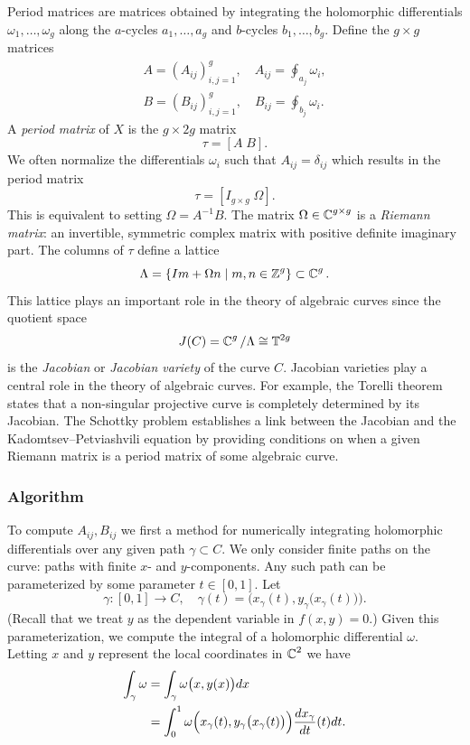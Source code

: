 Period matrices are matrices obtained by integrating the holomorphic
differentials $\omega_1, \ldots, \omega_g$ along the $a$-cycles $a_1,\ldots,a_g$
and $b$-cycles $b_1,\ldots,b_g$. Define the $g \times g$ matrices
\begin{align*}
  A = \left( A_{ij} \right)_{i,j=1}^g,
  \quad A_{ij} = \oint_{a_j} \omega_i, \\
  B = \left( B_{ij} \right)_{i,j=1}^g,
  \quad B_{ij} = \oint_{b_j} \omega_i.
\end{align*}
A {\it period matrix} of $X$ is the $g \times 2g$ matrix
\[
  \tau = \left[ A \; B \right].
\]
We often normalize the differentials $\omega_i$ such that $A_{ij} = \delta_{ij}$
which results in the period matrix
\begin{equation} \label{eqn: period-matrix}
  \tau = \left[ I_{g \times g} \; \Omega \right].
\end{equation}
This is equivalent to setting $\Omega = A^{-1}B$. The matrix $\Omega \in \operatorname{\mathbb{C}}^{g
  \times g}$ is a {\it Riemann matrix}: an invertible, symmetric complex matrix
with positive definite imaginary part. The columns of $\tau$ define a lattice
\[
  \Lambda = \{I m + \Omega n \; | \; m,n \in \operatorname{\mathbb{Z}}^g\} \subset \operatorname{\mathbb{C}}^g.
\]
This lattice plays an important role in the theory of algebraic curves since the
quotient space
\begin{equation} \label{eqn: jacobian}
  J(C) = \operatorname{\mathbb{C}}^g / \Lambda \cong \mathbb{T}^{2g}
\end{equation}
is the {\it Jacobian} or {\it Jacobian variety} of the curve $C$. Jacobian
varieties play a central role in the theory of algebraic curves. For example,
the Torelli theorem \cite{Mumford99} states that a non-singular projective curve
is completely determined by its Jacobian. The Schottky problem establishes a
link between the Jacobian and the Kadomtsev--Petviashvili equation by providing
conditions on when a given Riemann matrix is a period matrix of some algebraic
curve.


%
\subsubsection*{Algorithm}
%

To compute $A_{ij}, B_{ij}$ we first a method for numerically integrating
holomorphic differentials over any given path $\gamma \subset C$. We only
consider finite paths on the curve: paths with finite $x$- and $y$-components.
Any such path can be parameterized by some parameter $t \in [0,1]$. Let
\[
  \gamma : [0,1] \to C, \quad \gamma(t) = \Big( x_\gamma(t),
  y_\gamma\big(x_\gamma(t)\big) \Big).
\]
(Recall that we treat $y$ as the dependent variable in $f(x,y)=0$.) Given this
parameterization, we compute the integral of a holomorphic differential
$\omega$. Letting $x$ and $y$ represent the local coordinates in $\operatorname{\mathbb{C}}^2$ we have
\begin{align}
  \int_\gamma \omega
  &=
    \int_\gamma \omega\big(x,y(x)\big)dx \notag \\
  &=
    \int_0^1 \omega \Big(
    x_\gamma(t), y_\gamma\big(x_\gamma(t)\big) \Big)
    \frac{dx_\gamma}{dt}(t) dt. \label{eqn: path-integral}
\end{align}

